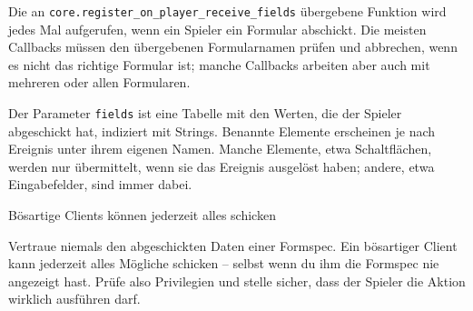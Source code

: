 \begin{Shaded}
\begin{Highlighting}[]
\OperatorTok{(}
    \OperatorTok{(}\OperatorTok{,} \OperatorTok{,} \OperatorTok{)}
          \OperatorTok{\textasciitilde{}=}  

          
              \OperatorTok{=} \OperatorTok{:}\OperatorTok{()}
            \OperatorTok{(}
                     
                     
                     
            \OperatorTok{)}
\OperatorTok{)}
\end{Highlighting}
\end{Shaded}

Die an
\texttt{core.\allowbreak{}register\_\allowbreak{}on\_\allowbreak{}player\_\allowbreak{}receive\_\allowbreak{}fields}
übergebene Funktion wird jedes Mal aufgerufen, wenn ein Spieler ein
Formular abschickt. Die meisten Callbacks müssen den übergebenen
Formularnamen prüfen und abbrechen, wenn es nicht das richtige Formular
ist; manche Callbacks arbeiten aber auch mit mehreren oder allen
Formularen.

Der Parameter \texttt{fields} ist eine Tabelle mit den Werten, die der
Spieler abgeschickt hat, indiziert mit Strings. Benannte Elemente
erscheinen je nach Ereignis unter ihrem eigenen Namen. Manche Elemente,
etwa Schaltflächen, werden nur übermittelt, wenn sie das Ereignis
ausgelöst haben; andere, etwa Eingabefelder, sind immer dabei.

\begin{hinweis}{Bösartige Clients können jederzeit alles schicken}

Vertraue niemals den abgeschickten Daten einer Formspec. Ein bösartiger
Client kann jederzeit alles Mögliche schicken -- selbst wenn du ihm die
Formspec nie angezeigt hast. Prüfe also
Privilegien und stelle sicher, dass der Spieler
die Aktion wirklich ausführen darf.

\end{hinweis}

